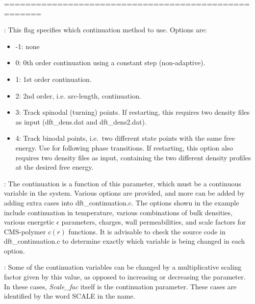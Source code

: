 \documentclass[10pt,onecolumn]{article}
\begin{document}
\noindent=====================================================
\vspace{0.1in}


\vspace{0.1in}
:  This flag specifies which continuation method to use.  Options are:

\begin{itemize}
\item -1: none

\item 0: 0th order continuation using a constant step (non-adaptive).

\item 1: 1st order continuation.

\item 2: 2nd order, i.e. arc-length, continuation.

\item 3: Track spinodal (turning) points.  If restarting, this requires two density files as input (dft\_dens.dat and dft\_dens2.dat).

\item 4: Track binodal points, i.e.\ two different state points with the same free energy.  Use for following phase transitions.    If restarting, this option also requires two density files as input, containing the two different density profiles at the desired free energy.
\end{itemize}

\vspace{0.1in}
:  The continuation is a function of this parameter, which must be a continuous variable in the system.  Various options are provided, and more can be added by adding extra cases into dft\_continuation.c.  The options shown in the example include continuation in temperature, various combinations of bulk densities, various energetic $\epsilon$ parameters, charges, wall permeabilities, and scale factors for CMS-polymer $c(r)$ functions.  It is advisable to check the source code in dft\_continuation.c to determine exactly which variable is being changed in each option.

\vspace{0.1in}
: Some of the continuation variables can be changed by a multiplicative scaling factor given by this value, as opposed to increasing or decreasing the parameter.  In these cases, {\it Scale\_fac} itself is the continuation parameter.  These cases are identified by the word SCALE in the name.
\end{document}
